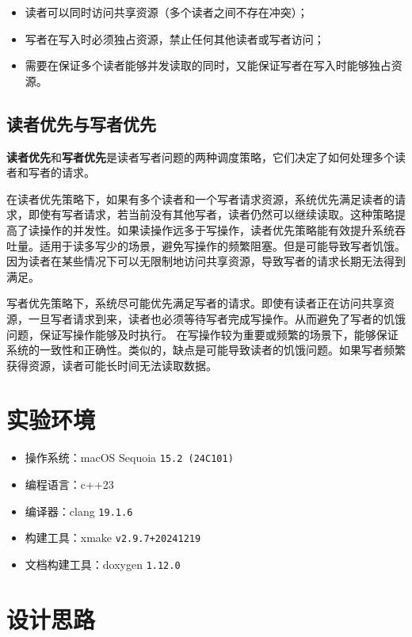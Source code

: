 \begin{itemize}
    \item 读者可以同时访问共享资源（多个读者之间不存在冲突）；
    \item 写者在写入时必须独占资源，禁止任何其他读者或写者访问；
    \item 需要在保证多个读者能够并发读取的同时，又能保证写者在写入时能够独占资源。
\end{itemize}

\subsection{读者优先与写者优先}

\textbf{读者优先}和\textbf{写者优先}是读者写者问题的两种调度策略，它们决定了如何处理多个读者和写者的请求。

在读者优先策略下，如果有多个读者和一个写者请求资源，系统优先满足读者的请求，即使有写者请求，若当前没有其他写者，读者仍然可以继续读取。这种策略提高了读操作的并发性。如果读操作远多于写操作，读者优先策略能有效提升系统吞吐量。适用于读多写少的场景，避免写操作的频繁阻塞。但是可能导致写者饥饿。因为读者在某些情况下可以无限制地访问共享资源，导致写者的请求长期无法得到满足。

写者优先策略下，系统尽可能优先满足写者的请求。即使有读者正在访问共享资源，一旦写者请求到来，读者也必须等待写者完成写操作。从而避免了写者的饥饿问题，保证写操作能够及时执行。	在写操作较为重要或频繁的场景下，能够保证系统的一致性和正确性。类似的，缺点是可能导致读者的饥饿问题。如果写者频繁获得资源，读者可能长时间无法读取数据。

\section{实验环境}

\begin{itemize}
    \item 操作系统：macOS Sequoia \texttt{15.2 (24C101)}
    \item 编程语言：c++23
    \item 编译器：clang \texttt{19.1.6}
    \item 构建工具：xmake \texttt{v2.9.7+20241219}
    \item 文档构建工具：doxygen \texttt{1.12.0}
\end{itemize}

\section{设计思路}


